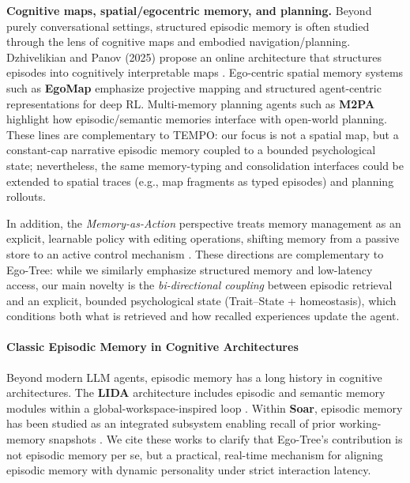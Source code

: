 \documentclass[11pt]{article}
\begin{document}
\textbf{Cognitive maps, spatial/egocentric memory, and planning.}
Beyond purely conversational settings, structured episodic memory is often studied through the lens of cognitive maps and embodied navigation/planning. Dzhivelikian and Panov (2025) propose an online architecture that structures episodes into cognitively interpretable maps \cite{dzhivelikian2025cognitivemaps}. Ego-centric spatial memory systems such as \textbf{EgoMap} \cite{egomap2021} emphasize projective mapping and structured agent-centric representations for deep RL. Multi-memory planning agents such as \textbf{M2PA} \cite{m2pa2025} highlight how episodic/semantic memories interface with open-world planning. These lines are complementary to TEMPO: our focus is not a spatial map, but a constant-cap narrative episodic memory coupled to a bounded psychological state; nevertheless, the same memory-typing and consolidation interfaces could be extended to spatial traces (e.g., map fragments as typed episodes) and planning rollouts.

In addition, the \textit{Memory-as-Action} perspective treats memory management as an explicit, learnable policy with editing operations, shifting memory from a passive store to an active control mechanism \cite{zhang2025memoryasaction}. These directions are complementary to Ego-Tree: while we similarly emphasize structured memory and low-latency access, our main novelty is the \emph{bi-directional coupling} between episodic retrieval and an explicit, bounded psychological state (Trait--State + homeostasis), which conditions both what is retrieved and how recalled experiences update the agent.

\paragraph{Classic Episodic Memory in Cognitive Architectures}
Beyond modern LLM agents, episodic memory has a long history in cognitive architectures. The \textbf{LIDA} architecture includes episodic and semantic memory modules within a global-workspace-inspired loop \cite{ramamurthy2006lida}. Within \textbf{Soar}, episodic memory has been studied as an integrated subsystem enabling recall of prior working-memory snapshots \cite{nuxoll2012episodic}. We cite these works to clarify that Ego-Tree's contribution is not episodic memory per se, but a practical, real-time mechanism for aligning episodic memory with dynamic personality under strict interaction latency.
\end{document}
